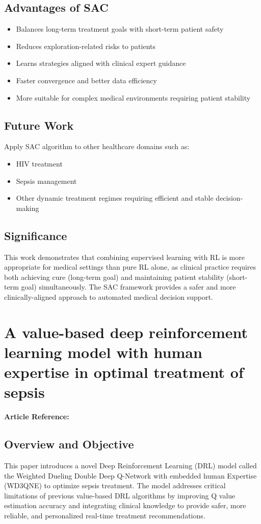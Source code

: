 \subsection*{Advantages of SAC}
\begin{itemize}
    \item Balances long-term treatment goals with short-term patient safety
    \item Reduces exploration-related risks to patients
    \item Learns strategies aligned with clinical expert guidance
    \item Faster convergence and better data efficiency
    \item More suitable for complex medical environments requiring patient stability
\end{itemize}

\subsection*{Future Work}
Apply SAC algorithm to other healthcare domains such as:
\begin{itemize}
    \item HIV treatment
    \item Sepsis management
    \item Other dynamic treatment regimes requiring efficient and stable decision-making
\end{itemize}

\subsection*{Significance}
This work demonstrates that combining supervised learning with RL is more appropriate for medical settings than pure RL alone, as clinical practice requires both achieving cure (long-term goal) and maintaining patient stability (short-term goal) simultaneously. The SAC framework provides a safer and more clinically-aligned approach to automated medical decision support.

\section{A value-based deep reinforcement learning model with human expertise in optimal treatment of sepsis}
\textbf{Article Reference:} \cite{wuValuebasedDeepReinforcement2023}

\subsection*{Overview and Objective}
This paper introduces a novel Deep Reinforcement Learning (DRL) model called the Weighted Dueling Double Deep Q-Network with embedded human Expertise (WD3QNE) to optimize sepsis treatment. The model addresses critical limitations of previous value-based DRL algorithms by improving Q value estimation accuracy and integrating clinical knowledge to provide safer, more reliable, and personalized real-time treatment recommendations.


